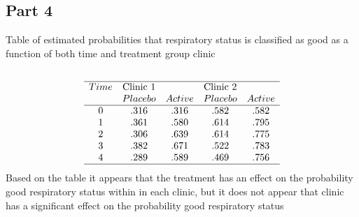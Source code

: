 \documentclass{article}
\begin{document}
\begin{flushleft}
\subsection*{Part 4}
Table of estimated probabilities that respiratory status is classified as good as a function of both time and treatment group clinic
\begin{multline*}\\
\begin{array}{ccccc}
\hline
 Time &  \text{Clinic 1} & & \text{Clinic 2}\\
  & Placebo & Active & Placebo &Active\\
 \hline
 0 &.316 &.316& .582 &.582\\
 1 & .361&.580&.614&.795\\
 2&.306&.639&.614&.775\\
 3&.382&.671&.522&.783\\
 4&.289&.589&.469&.756\\
 \hline
\end{array}\\
\end{multline*}
Based on the table it appears that the treatment has an effect on the probability good respiratory status within in each clinic, but it does not appear that clinic has a significant effect on the probability good respiratory status
\end{flushleft}
\end{document}
